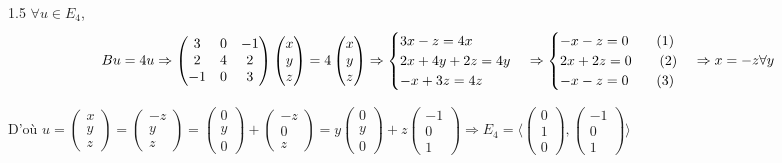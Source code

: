 \documentclass[12pt]{article}
\begin{document}
\begin{spacing}{1.5}
$\forall u\in E_4$, \[Bu=4u\Rightarrow \begin{pmatrix}
3 & 0 & -1 \\ 
2 & 4 & 2 \\ 
-1 & 0 & 3
\end{pmatrix}\begin{pmatrix}
x\\
y\\
z
\end{pmatrix}=4\begin{pmatrix}
x\\
y\\
z
\end{pmatrix}\Rightarrow \begin{cases}
3x-z=4x\\
2x+4y+2z=4y\\
-x+3z=4z
\end{cases}\Rightarrow \begin{cases}
-x-z=0 \hspace{0.7cm}(1)\\
2x+2z=0 \hspace{0.7cm}(2)\\
-x-z=0 \hspace{0.7cm} (3)
\end{cases}\Rightarrow x=-z\forall y\]

D'où $u=\begin{pmatrix}
x\\
y\\
z
\end{pmatrix}=\begin{pmatrix}
-z\\
y\\
z
\end{pmatrix}=\begin{pmatrix}
0\\
y\\
0
\end{pmatrix}+\begin{pmatrix}
-z\\
0\\
z
\end{pmatrix}=y\begin{pmatrix}
0\\
y\\
0
\end{pmatrix}+z\begin{pmatrix}
-1\\
0\\
1
\end{pmatrix} \Rightarrow E_4=\langle \begin{pmatrix}
0\\
1\\
0
\end{pmatrix},\begin{pmatrix}
-1\\
0\\
1
\end{pmatrix}\rangle$


\end{spacing}
\end{document}
